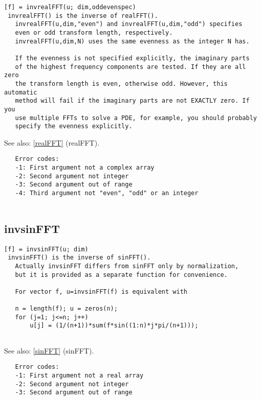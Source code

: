 \documentclass[a4paper]{article}
\begin{document}
\begin{tscreen}
\begin{verbatim}
[f] = invrealFFT(u; dim,oddevenspec)
 invrealFFT() is the inverse of realFFT().
   invrealFFT(u,dim,"even") and invrealFFT(u,dim,"odd") specifies
   even or odd transform length, respectively.
   invrealFFT(u,dim,N) uses the same evenness as the integer N has.

   If the evenness is not specified explicitly, the imaginary parts
   of the highest frequency components are tested. If they are all zero
   the transform length is even, otherwise odd. However, this automatic
   method will fail if the imaginary parts are not EXACTLY zero. If you
   use multiple FFTs to solve a PDE, for example, you should probably
   specify the evenness explicitly.
\end{verbatim}

See also: \ref{realFFT} {(realFFT)}.
\begin{verbatim}
   Error codes:
   -1: First argument not a complex array
   -2: Second argument not integer
   -3: Second argument out of range
   -4: Third argument not "even", "odd" or an integer
   
\end{verbatim}
\end{tscreen}





\subsection{invsinFFT\label{invsinFFT}}

\begin{tscreen}
\begin{verbatim}
[f] = invsinFFT(u; dim)
 invsinFFT() is the inverse of sinFFT().
   Actually invsinFFT differs from sinFFT only by normalization,
   but it is provided as a separate function for convenience.
   
   For vector f, u=invsinFFT(f) is equivalent with

   n = length(f); u = zeros(n);
   for (j=1; j<=n; j++)
       u[j] = (1/(n+1))*sum(f*sin((1:n)*j*pi/(n+1)));
   
\end{verbatim}

See also: \ref{sinFFT} {(sinFFT)}.
\begin{verbatim}
   Error codes:
   -1: First argument not a real array
   -2: Second argument not integer
   -3: Second argument out of range
   
\end{verbatim}
\end{tscreen}
\end{document}
